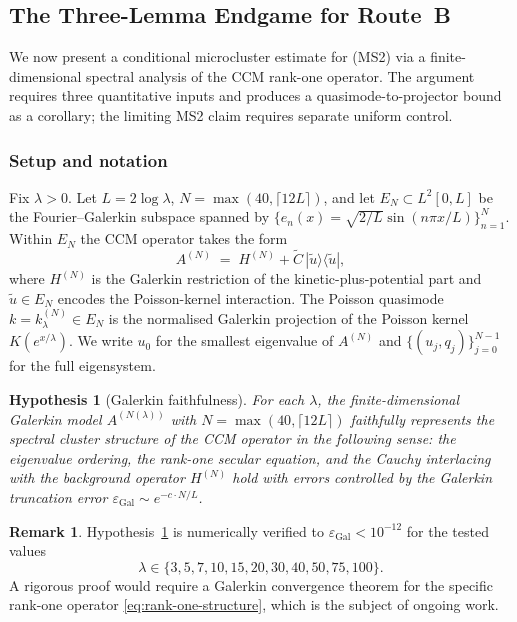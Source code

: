 \documentclass[11pt,a4paper]{article}
\theoremstyle{plain}
\newtheorem{hypothesis}[theorem]{Hypothesis}
\theoremstyle{definition}
\newtheorem{remark}[theorem]{Remark}
\begin{document}
\subsection{The Three-Lemma Endgame for Route~B}
\label{sec:three-lemma-endgame}

We now present a conditional microcluster estimate for (MS2) via a
finite-dimensional spectral analysis of the CCM rank-one operator.
The argument requires three quantitative inputs and produces a
quasimode-to-projector bound as a corollary; the limiting MS2 claim
requires separate uniform control.

\subsubsection{Setup and notation}

Fix $\lambda > 0$.  Let $L = 2\log\lambda$, $N = \max(40,
\lceil 12L \rceil)$, and let $E_N \subset L^2[0,L]$ be the
Fourier--Galerkin subspace spanned by $\{e_n(x) = \sqrt{2/L}
\sin(n\pi x/L)\}_{n=1}^N$.  Within $E_N$ the CCM operator takes the
form
\begin{equation}\label{eq:rank-one-structure}
  A^{(N)} \;=\; H^{(N)} + \tilde{C}\,|\tilde{u}\rangle\langle\tilde{u}|,
\end{equation}
where $H^{(N)}$ is the Galerkin restriction of the kinetic-plus-potential
part and $\tilde{u} \in E_N$ encodes the Poisson-kernel interaction.
The Poisson quasimode $k = k_\lambda^{(N)} \in E_N$ is the normalised
Galerkin projection of the Poisson kernel $K(e^{x/\lambda})$.
We write $u_0$ for the smallest eigenvalue of $A^{(N)}$ and
$\{(u_j, q_j)\}_{j=0}^{N-1}$ for the full eigensystem.

\begin{hypothesis}[Galerkin faithfulness]
\label{hyp:galerkin}
For each $\lambda$, the finite-dimensional Galerkin model
$A^{(N(\lambda))}$ with $N = \max(40, \lceil 12L \rceil)$
faithfully represents the spectral cluster structure of the CCM
operator in the following sense: the eigenvalue ordering, the rank-one
secular equation, and the Cauchy interlacing with the background
operator $H^{(N)}$ hold with errors controlled by the Galerkin
truncation error $\varepsilon_{\mathrm{Gal}} \sim e^{-c \cdot N/L}$.
\end{hypothesis}

\begin{remark}
Hypothesis~\ref{hyp:galerkin} is numerically verified to
$\varepsilon_{\mathrm{Gal}} < 10^{-12}$ for the tested values
\[
  \lambda \in \{3,5,7,10,15,20,30,40,50,75,100\}.
\]
A rigorous proof would require a Galerkin convergence theorem for the
specific rank-one operator \eqref{eq:rank-one-structure}, which is the
subject of ongoing work.
\end{remark}
\end{document}
